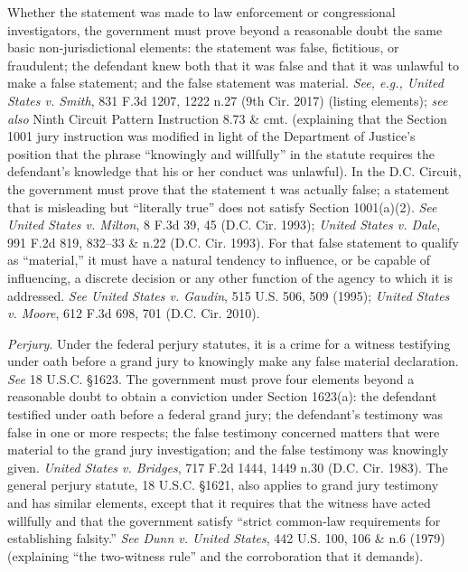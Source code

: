 Whether the statement was made to law enforcement or congressional investigators, the government must prove beyond a reasonable doubt the same basic non-jurisdictional elements: the statement was false, fictitious, or fraudulent; the defendant knew both that it was false and that it was unlawful to make a false statement; and the false statement was material.
\textit{See, e.g., United States v. Smith}, 831 F.3d 1207, 1222 n.27 (9th Cir. 2017) (listing elements); \textit{see also} Ninth Circuit Pattern Instruction 8.73 \& cmt. (explaining that the Section 1001 jury instruction was modified in light of the Department of Justice's position that the phrase ``knowingly and willfully'' in the statute requires the defendant's knowledge that his or her conduct was unlawful).
In the D.C. Circuit, the government must prove that the statement t was actually false; a statement that is misleading but ``literally true'' does not satisfy Section 1001(a)(2).
\textit{See United States v. Milton}, 8 F.3d 39, 45 (D.C. Cir. 1993); \textit{United States v. Dale}, 991 F.2d 819, 832--33 \& n.22 (D.C. Cir. 1993).
For that false statement to qualify as ``material,'' it must have a natural tendency to influence, or be capable of influencing, a discrete decision or any other function of the agency to which it is addressed.
\textit{See United States v. Gaudin}, 515 U.S. 506, 509 (1995); \textit{United States v. Moore}, 612 F.3d 698, 701 (D.C. Cir. 2010).

\textit{Perjury}.
Under the federal perjury statutes, it is a crime for a witness testifying under oath before a grand jury to knowingly make any false material declaration.
\textit{See} 18 U.S.C. \S 1623.
The government must prove four elements beyond a reasonable doubt to obtain a conviction under Section 1623(a): the defendant testified under oath before a federal grand jury; the defendant's testimony was false in one or more respects; the false testimony concerned matters that were material to the grand jury investigation; and the false testimony was knowingly given.
\textit{United States v. Bridges}, 717 F.2d 1444, 1449 n.30 (D.C. Cir. 1983).
The general perjury statute, 18 U.S.C. \S 1621, also applies to grand jury testimony and has similar elements, except that it requires that the witness have acted willfully and that the government satisfy ``strict common-law requirements for establishing falsity.''
\textit{See Dunn v. United States}, 442 U.S. 100, 106 \& n.6 (1979) (explaining ``the two-witness rule'' and the corroboration that it demands).

